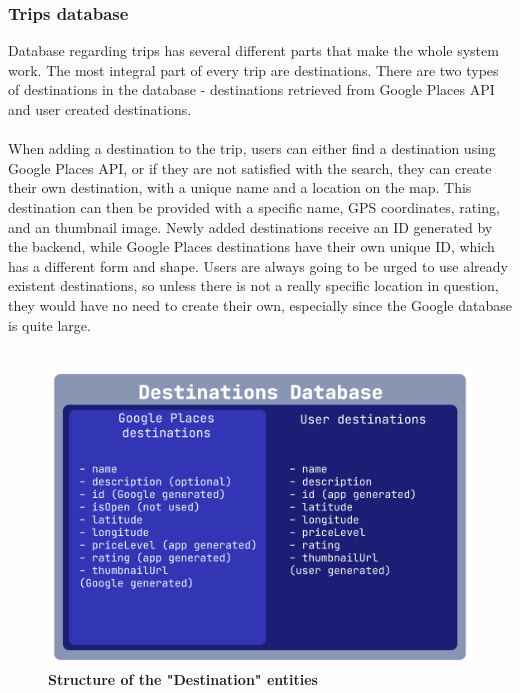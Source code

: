 \subsubsection{Trips database}
\hspace{\parindent}Database regarding trips has several different parts that make the whole system work. The most integral part of every trip are destinations. There are two types of destinations in the database - destinations retrieved from Google Places API and user created destinations.\\ \\
When adding a destination to the trip, users can either find a destination using Google Places API, or if they are not satisfied with the search, they can create their own destination, with a unique name and a location on the map. This destination can then be provided with a specific name, GPS coordinates, rating, and an thumbnail image. Newly added destinations receive an ID generated by the backend, while Google Places destinations have their own unique ID, which has a different form and shape. Users are always going to be urged to use already existent destinations, so unless there is not a really specific location in question, they would have no need to create their own, especially since the Google database is quite large.\\ \\

\begin{figure}[!htb]
\centering
\includegraphics[width=\textwidth]{../Images/DestinationsStructurePNG.png}
\caption{\label{fig:dbapiuser}\textbf{Structure of the "Destination" entities}}
\end{figure}
\newpage

